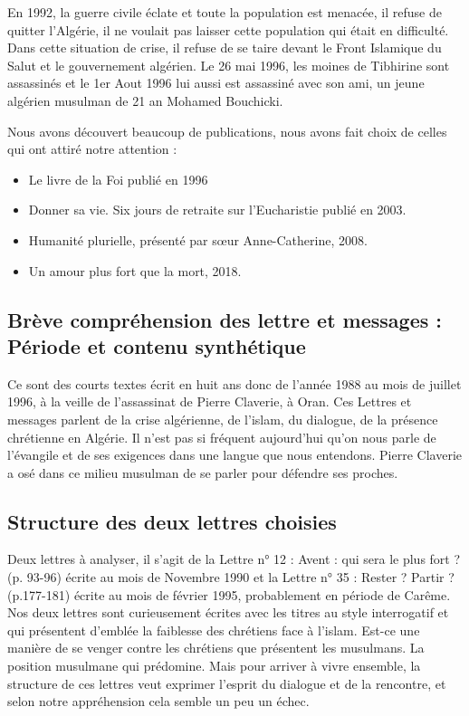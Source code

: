 En 1992, la guerre civile éclate et toute la population est menacée, il refuse de quitter l’Algérie, il ne voulait pas laisser cette population qui était en difficulté. Dans cette situation de crise, il refuse de se taire devant le Front Islamique du Salut et le gouvernement algérien. Le 26 mai 1996, les moines de Tibhirine sont assassinés et le 1er Aout 1996 lui aussi est assassiné avec son ami, un jeune algérien musulman de 21 an Mohamed Bouchicki. 

Nous avons découvert beaucoup de publications, nous avons fait choix de celles qui ont attiré notre attention : 
\begin{itemize}
    \item  	Le livre de la Foi publié en 1996
\item 	Donner sa vie. Six jours de retraite sur l’Eucharistie publié en 2003. 
\item 	Humanité plurielle, présenté par sœur Anne-Catherine, 2008. 
\item 	Un amour plus fort que la mort, 2018. 
\end{itemize}

\subsection{Brève compréhension des lettre et messages : Période et contenu synthétique}
 
Ce sont des courts textes écrit en huit ans donc de l'année 1988 au mois de juillet 1996, à la veille de l'assassinat de Pierre Claverie, à Oran.  Ces Lettres et messages parlent de la crise algérienne, de l'islam, du dialogue, de la présence chrétienne en Algérie. Il n'est pas si fréquent aujourd'hui qu'on nous parle de l'évangile et de ses exigences dans une langue que nous entendons.  Pierre Claverie a osé dans ce milieu musulman de se parler pour défendre ses proches.

\subsection{Structure des deux lettres choisies}
 

Deux lettres à analyser, il s’agit de la Lettre n° 12 : Avent : qui sera le plus fort ? (p. 93-96) écrite au mois de Novembre 1990 et la Lettre n° 35 : Rester ? Partir ? (p.177-181) écrite au mois de février 1995, probablement en période de Carême. 
Nos deux lettres sont curieusement écrites avec les titres au style interrogatif et qui présentent d’emblée la faiblesse des chrétiens face à l’islam. Est-ce une manière de se venger contre les chrétiens que présentent les musulmans. La position musulmane qui prédomine. Mais pour arriver à vivre ensemble, la structure de ces lettres veut exprimer l’esprit du dialogue et de la rencontre, et selon notre appréhension cela semble un peu un échec. 


